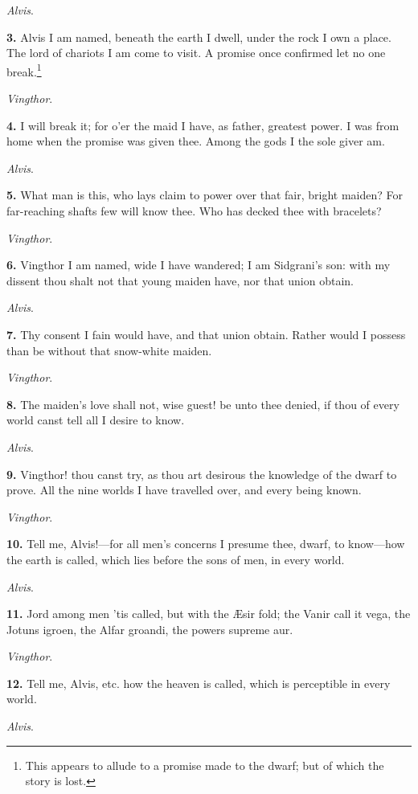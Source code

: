 \emph{Alvis}.

\textbf{3.} Alvis I am named, beneath the earth I dwell, under the rock I own
a place. The lord of chariots I am come to visit. A promise once
confirmed let no one break.\footnote{This appears to allude to a promise made to the dwarf;
but of which the story is lost.}

\emph{Vingthor}.

\textbf{4.} I will break it; for o'er the maid I have, as father, greatest
power. I was from home when the promise was given thee. Among the gods
I the sole giver am.

\emph{Alvis}.

\textbf{5.} What man is this, who lays claim to power over that fair, bright
maiden? For far-reaching shafts few will know thee. Who has decked
thee with bracelets?

\emph{Vingthor}.

\textbf{6.} Vingthor I am named, wide I have wandered; I am Sidgrani's son:
with my dissent thou shalt not that young maiden have, nor that union
obtain.

\emph{Alvis}.

\textbf{7.} Thy consent I fain would have, and that union obtain. Rather
would I possess than be without that snow-white maiden.

\emph{Vingthor}.

\textbf{8.} The maiden's love shall not, wise guest! be unto thee denied, if
thou of every world canst tell all I desire to know.

\emph{Alvis}.

\textbf{9.} Vingthor! thou canst try, as thou art desirous the knowledge of
the dwarf to prove. All the nine worlds I have travelled over, and
every being known.

\emph{Vingthor}.

\textbf{10.} Tell me, Alvis!—for all men's concerns I presume thee, dwarf,
to know—how the earth is called, which lies before the sons of men,
in every world.

\emph{Alvis}.

\textbf{11.} Jord among men 'tis called, but with the Æsir fold; the Vanir
call it vega, the Jotuns igroen, the Alfar groandi, the powers supreme
aur.

\emph{Vingthor}.

\textbf{12.} Tell me, Alvis, etc. how the heaven is called, which is
perceptible in every world.

\emph{Alvis}.

